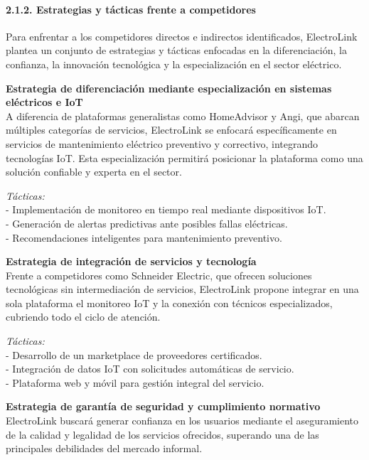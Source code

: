 \paragraph{2.1.2. Estrategias y tácticas frente a
competidores}\label{report__20-cap2-requirements-analysis.md__estrategias-y-tuxe1cticas-frente-a-competidores}

Para enfrentar a los competidores directos e indirectos identificados,
ElectroLink plantea un conjunto de estrategias y tácticas enfocadas en
la diferenciación, la confianza, la innovación tecnológica y la
especialización en el sector eléctrico.

\textbf{Estrategia de diferenciación mediante especialización en
sistemas eléctricos e IoT}\\
A diferencia de plataformas generalistas como HomeAdvisor y Angi, que
abarcan múltiples categorías de servicios, ElectroLink se enfocará
específicamente en servicios de mantenimiento eléctrico preventivo y
correctivo, integrando tecnologías IoT. Esta especialización permitirá
posicionar la plataforma como una solución confiable y experta en el
sector.

\emph{Tácticas:}\\
- Implementación de monitoreo en tiempo real mediante dispositivos
IoT.\\
- Generación de alertas predictivas ante posibles fallas eléctricas.\\
- Recomendaciones inteligentes para mantenimiento preventivo.

\textbf{Estrategia de integración de servicios y tecnología}\\
Frente a competidores como Schneider Electric, que ofrecen soluciones
tecnológicas sin intermediación de servicios, ElectroLink propone
integrar en una sola plataforma el monitoreo IoT y la conexión con
técnicos especializados, cubriendo todo el ciclo de atención.

\emph{Tácticas:}\\
- Desarrollo de un marketplace de proveedores certificados.\\
- Integración de datos IoT con solicitudes automáticas de servicio.\\
- Plataforma web y móvil para gestión integral del servicio.

\textbf{Estrategia de garantía de seguridad y cumplimiento normativo}\\
ElectroLink buscará generar confianza en los usuarios mediante el
aseguramiento de la calidad y legalidad de los servicios ofrecidos,
superando una de las principales debilidades del mercado informal.


